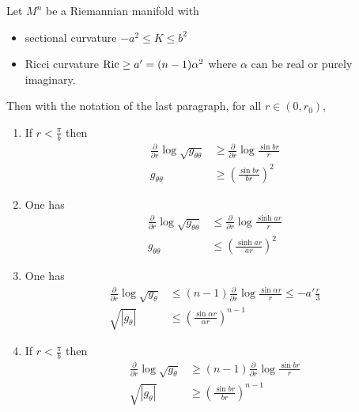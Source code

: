 \documentclass[11pt]{article}
\begin{document}
\begin{theorem}
\label{thm:vol-comparison}
Let \(M^n\) be a Riemannian manifold with
\begin{itemize}
\item sectional curvature \(-a^2 \leq K\leq b^2\)
\item Ricci curvature \({\rm Ric} \geq a' = (n-1)\alpha^2\) where \(\alpha\) can be real or
purely imaginary.
\end{itemize}
Then with the notation of the last paragraph, for all \(r \in (0, r_0)\),
\begin{enumerate}
\item If \(r<\frac{\pi}{b}\) then
\begin{equation}
\label{eq:comp-1}
\begin{split}
 \frac{\partial}{\partial r}\log   \sqrt{g_{\theta\theta}} &\geq \frac{\partial}{\partial r}\log \frac{\sin br}{r}\\  
  g_{\theta\theta} &\geq \left(\frac{\sin br}{br}\right)^2
\end{split}   
\end{equation}
\item One has
\begin{equation}
\label{eq:comp-2}
\begin{split}
 \frac{\partial}{\partial r}\log   \sqrt{g_{\theta\theta}} &\leq \frac{\partial}{\partial r}\log \frac{\sinh ar}{r}\\  
 g_{\theta\theta} &\leq \left(\frac{\sinh ar}{ar}\right)^2
\end{split}   
\end{equation}
\item One has
\begin{equation}
\label{eq:comp-3}
\begin{split}
 \frac{\partial}{\partial r}\log   \sqrt{g_{\theta}} &\leq (n-1) \frac{\partial}{\partial r}\log \frac{\sin \alpha r}{r} \leq -a' \frac{r}{3}\\  
  \sqrt{|g_{\theta}|} &\leq \left(\frac{\sin \alpha r}{\alpha r}\right)^{n-1}
\end{split}   
\end{equation}
\item If \(r<\frac{\pi}{b}\) then
\begin{equation}
\label{eq:comp-4}
\begin{split}
 \frac{\partial}{\partial r}\log   \sqrt{g_{\theta}} &\geq (n-1) \frac{\partial}{\partial r}\log \frac{\sin b r}{r}\\  
 \sqrt{|g_{\theta}|} &\geq \left(\frac{\sin br}{br}\right)^{n-1}       
\end{split}   
\end{equation}
\end{enumerate}
\end{theorem}
\end{document}
